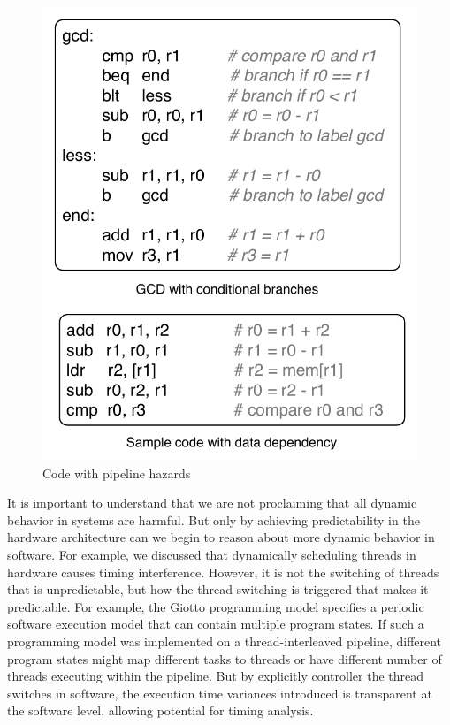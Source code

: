 \begin{figure}
  \vspace{-20pt}
  \begin{center}
    \includegraphics[scale=.65]{figs/sample_code_for_pipeline_hazards}
  \end{center}
  \vspace{-3mm}
  \caption{Code with pipeline hazards}
  \label{fig:sample_code_for_pipeline_hazards}
\end{figure}


It is important to understand that we are not proclaiming that all dynamic behavior in systems are harmful. 
But only by achieving predictability in the hardware architecture can we begin to reason about more dynamic behavior in software.
For example, we discussed that dynamically scheduling threads in hardware causes timing interference. 
However, it is not the switching of threads that is unpredictable, but how the thread switching is triggered that makes it predictable.   
For example, the Giotto programming model specifies a periodic software execution model that can contain multiple program states. 
If such a programming model was implemented on a thread-interleaved pipeline, different program states might map different tasks to threads or have different number of threads executing within the pipeline.
But by explicitly controller the thread switches in software, the execution time variances introduced is transparent at the software level, allowing potential for timing analysis.




